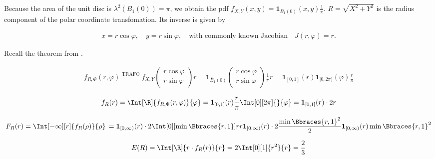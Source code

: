 \begin{solution}

Because the area of the unit disc is $\lambda^2(B_1(0)) = \pi$, we obtain the pdf $f_{X, Y}(x, y) = \mathbf 1_{B_1(0)}(x, y) \frac{1}{\pi}$.
$R = \sqrt{X^2 + Y^2}$ is the radius component of the polar coordinate transfomation.
Its inverse is given by

\begin{align*}
    x = r \cos \varphi,
    \quad
    y = r \sin \varphi,
    \quad
    \text{with commonly known Jacobian}
    \quad
    J(r, \varphi) = r.
\end{align*}

Recall the theorem from \cite[Lecture 3, Slide 32]{EStat}.

\begin{align*}
    f_{R, \Phi}(r, \varphi)
    \stackrel
    {
        \text{TRAFO}
    }{=}
    f_{X, Y}
    \begin{pmatrix}
        r \cos \varphi \\
        r \sin \varphi
    \end{pmatrix}
    r
    =
    \mathbf 1_{\overline B_1(0)}
    \begin{pmatrix}
        r \cos \varphi \\
        r \sin \varphi
    \end{pmatrix}
    \frac{1}{\pi}
    r
    =
    \mathbf 1_{[0, 1]}(r)
    \mathbf 1_{[0, 2 \pi)}(\varphi)
    \frac{r}{\pi}
\end{align*}

\begin{align*}
    f_R(r)
    =
    \Int[\R]{f_{R, \Phi}(r, \varphi)}{\varphi}
    =
    \mathbf 1_{[0, 1]}(r) \frac{r}{\pi} \Int[0][2 \pi]{}{\varphi}
    =
    \mathbf 1_{[0, 1]}(r) \cdot 2 r
\end{align*}

\begin{align*}
    F_R(r)
    =
    \Int[-\infty][r]{f_R(\rho)}{\rho} \,
    =
    \mathbf 1_{[0, \infty)}(r) \cdot 2 \Int[0][\min \Bbraces{r, 1}]{r}{r}
    \mathbf 1_{[0, \infty)}(r) \cdot 2 \frac{\min \Bbraces{r, 1}^2}{2}
    \mathbf 1_{[0, \infty)}(r) \min \Bbraces{r, 1}^2
\end{align*}

\begin{align*}
    E(R)
    =
    \Int[\R]{r \cdot f_R(r)}{r}
    =
    2 \Int[0][1]{r^2}{r}
    =
    \frac{2}{3}
\end{align*}

\end{solution}

